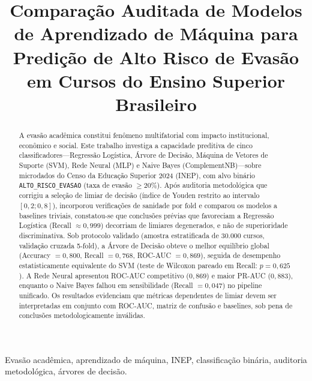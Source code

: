 \documentclass[conference]{IEEEtran}
\begin{document}
\title{Comparação Auditada de Modelos de Aprendizado de Máquina para Predição de Alto Risco de Evasão em Cursos do Ensino Superior Brasileiro}

\author{
}

\maketitle

\begin{abstract}
A evasão acadêmica constitui fenômeno multifatorial com impacto institucional, econômico e social. Este trabalho investiga a capacidade preditiva de cinco classificadores---Regressão Logística, Árvore de Decisão, Máquina de Vetores de Suporte (SVM), Rede Neural (MLP) e Naive Bayes (ComplementNB)---sobre microdados do Censo da Educação Superior 2024 (INEP), com alvo binário \texttt{ALTO\_RISCO\_EVASAO} (taxa de evasão $\geq 20\%$). Após auditoria metodológica que corrigiu a seleção de limiar de decisão (índice de Youden restrito ao intervalo $[0{,}2; 0{,}8]$), incorporou verificações de sanidade por fold e comparou os modelos a baselines triviais, constatou-se que conclusões prévias que favoreciam a Regressão Logística (Recall $\approx 0{,}999$) decorriam de limiares degenerados, e não de superioridade discriminativa. Sob protocolo validado (amostra estratificada de 30.000 cursos, validação cruzada 5-fold), a Árvore de Decisão obteve o melhor equilíbrio global (Accuracy $= 0{,}800$, Recall $= 0{,}768$, ROC-AUC $= 0{,}869$), seguida de desempenho estatisticamente equivalente do SVM (teste de Wilcoxon pareado em Recall: $p = 0{,}625$). A Rede Neural apresentou ROC-AUC competitivo ($0{,}869$) e maior PR-AUC ($0{,}883$), enquanto o Naive Bayes falhou em sensibilidade (Recall $= 0{,}047$) no pipeline unificado. Os resultados evidenciam que métricas dependentes de limiar devem ser interpretadas em conjunto com ROC-AUC, matriz de confusão e baselines, sob pena de conclusões metodologicamente inválidas.
\end{abstract}

\begin{IEEEkeywords}
Evasão acadêmica, aprendizado de máquina, INEP, classificação binária, auditoria metodológica, árvores de decisão.
\end{IEEEkeywords}

\end{document}
